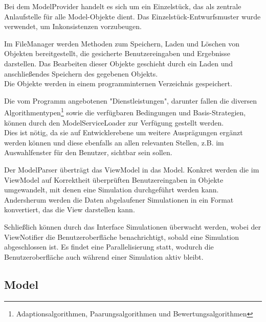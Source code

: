 Bei dem ModelProvider handelt es sich um ein Einzelstück, das als zentrale Anlaufstelle für alle Model-Objekte dient. Das Einzelstück-Entwurfsmuster wurde verwendet, um Inkonsistenzen vorzubeugen.

Im FileManager werden Methoden zum Speichern, Laden und Löschen von Objekten bereitgestellt, die gesicherte Benutzereingaben und Ergebnisse darstellen. Das Bearbeiten dieser Objekte geschieht durch ein Laden und anschließendes Speichern des gegebenen Objekts.\\
Die Objekte werden in einem programminternen Verzeichnis gespeichert.

Die vom Programm angebotenen "Dienstleistungen", darunter fallen die diversen Algorithmentypen\footnote{Adaptionsalgorithmen, Paarungsalgorithmen und Bewertungsalgorithmen} sowie die verfügbaren Bedingungen und Basis-Strategien, können durch den ModelServiceLoader zur Verfügung gestellt werden.\\
Dies ist nötig, da sie auf Entwicklerebene um weitere Ausprägungen ergänzt werden können und diese ebenfalls an allen relevanten Stellen, z.B. im Auswahlfenster für den Benutzer, sichtbar sein sollen.

Der ModelParser überträgt das ViewModel in das Model. Konkret werden die im ViewModel auf Korrektheit überprüften Benutzereingaben in Objekte umgewandelt, mit denen eine Simulation durchgeführt werden kann. Andersherum werden die Daten abgelaufener Simulationen in ein Format konvertiert, das die View darstellen kann.

Schließlich können durch das Interface Simulationen überwacht werden, wobei der ViewNotifier die Benutzeroberfläche benachrichtigt, sobald eine Simulation abgeschlossen ist. Es findet eine Parallelisierung statt, wodurch die Benutzeroberfläche auch während einer Simulation aktiv bleibt.

\subsection{Model}

\noindent
{}

